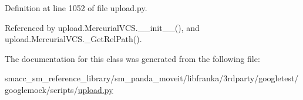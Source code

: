 Definition at line 1052 of file upload.\+py.



Referenced by upload.\+Mercurial\+V\+C\+S.\+\_\+\+\_\+init\+\_\+\+\_\+(), and upload.\+Mercurial\+V\+C\+S.\+\_\+\+Get\+Rel\+Path().



The documentation for this class was generated from the following file\+:\begin{DoxyCompactItemize}
\item 
smacc\+\_\+sm\+\_\+reference\+\_\+library/sm\+\_\+panda\+\_\+moveit/libfranka/3rdparty/googletest/googlemock/scripts/\hyperlink{googlemock_2scripts_2upload_8py}{upload.\+py}\end{DoxyCompactItemize}
